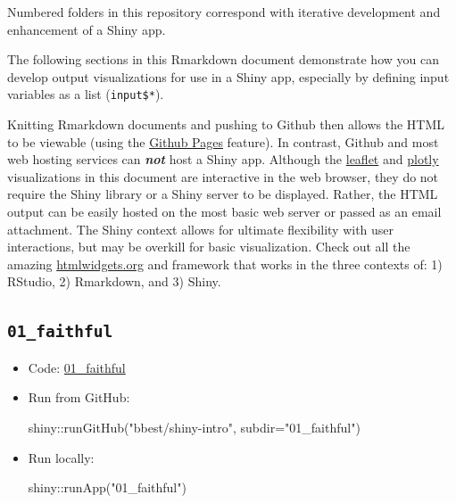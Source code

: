 \documentclass[
  letterpaper,
  DIV=11,
  numbers=noendperiod]{scrreprt}
\newenvironment{Shaded}{\begin{snugshade}}{\end{snugshade}}
\newcommand{\AttributeTok}[1]{\textcolor[rgb]{0.40,0.45,0.13}{#1}}
\newcommand{\FunctionTok}[1]{\textcolor[rgb]{0.28,0.35,0.67}{#1}}
\newcommand{\NormalTok}[1]{\textcolor[rgb]{0.00,0.23,0.31}{#1}}
\newcommand{\SpecialCharTok}[1]{\textcolor[rgb]{0.37,0.37,0.37}{#1}}
\newcommand{\StringTok}[1]{\textcolor[rgb]{0.13,0.47,0.30}{#1}}
\begin{document}
Numbered folders in this repository correspond with iterative
development and enhancement of a Shiny app.

The following sections in this Rmarkdown document demonstrate how you
can develop output visualizations for use in a Shiny app, especially by
defining input variables as a list (\texttt{input\$*}).

Knitting Rmarkdown documents and pushing to Github then allows the HTML
to be viewable (using the \href{https://pages.github.com}{Github Pages}
feature). In contrast, Github and most web hosting services can
\textbf{\emph{not}} host a Shiny app. Although the
\href{http://rstudio.github.io/leaflet}{leaflet} and
\href{https://plot.ly/ggplot2}{plotly} visualizations in this document
are interactive in the web browser, they do not require the Shiny
library or a Shiny server to be displayed. Rather, the HTML output can
be easily hosted on the most basic web server or passed as an email
attachment. The Shiny context allows for ultimate flexibility with user
interactions, but may be overkill for basic visualization. Check out all
the amazing \href{http://www.htmlwidgets.org/}{htmlwidgets.org} and
framework that works in the three contexts of: 1) RStudio, 2) Rmarkdown,
and 3) Shiny.

\hypertarget{faithful}{%
\subsection{\texorpdfstring{\texttt{01\_faithful}}{01\_faithful}}\label{faithful}}

\begin{itemize}
\item
  Code:
  \href{https://github.com/bbest/shiny-intro/tree/master/01_faithful}{01\_faithful}
\item
  Run from GitHub:

\begin{Shaded}
\begin{Highlighting}[]
\NormalTok{shiny}\SpecialCharTok{::}\FunctionTok{runGitHub}\NormalTok{(}\StringTok{"bbest/shiny{-}intro"}\NormalTok{, }\AttributeTok{subdir=}\StringTok{"01\_faithful"}\NormalTok{)}
\end{Highlighting}
\end{Shaded}
\item
  Run locally:

\begin{Shaded}
\begin{Highlighting}[]
\NormalTok{shiny}\SpecialCharTok{::}\FunctionTok{runApp}\NormalTok{(}\StringTok{"01\_faithful"}\NormalTok{)}
\end{Highlighting}
\end{Shaded}
\end{itemize}
\end{document}
